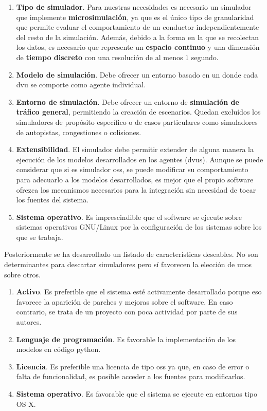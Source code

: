 \begin{enumerate}
	\item \textbf{Tipo de simulador}. Para nuestras necesidades es necesario un simulador que implemente \textbf{microsimulación}, ya que es el único tipo de granularidad que permite evaluar el comportamiento de un conductor independientemente del resto de la simulación. Además, debido a la forma en la que se recolectan los datos, es necesario que represente un \textbf{espacio continuo} y una dimensión de \textbf{tiempo discreto} con una resolución de al menos $1$ segundo.
	\item \textbf{Modelo de simulación}. Debe ofrecer un entorno basado en un \textbf{} donde cada \gls{dvu} se comporte como agente individual.
	\item \textbf{Entorno de simulación}. Debe ofrecer un entorno de \textbf{simulación de tráfico general}, permitiendo la creación de escenarios. Quedan excluídos los simuladores de propósito específico o de casos particulares como simuladores de autopistas, congestiones o colisiones.
	\item \textbf{Extensibilidad}. El simulador debe permitir extender de alguna manera la ejecución de los modelos desarrollados en los agentes (\glspl{dvu}). Aunque se puede considerar que si es simulador \gls{oss}, se puede modificar su comportamiento para adecuarlo a los modelos desarrollados, es mejor que el propio software ofrezca los mecanismos necesarios para la integración sin necesidad de tocar los fuentes del sistema.
	\item \textbf{Sistema operativo}. Es imprescindible que el software se ejecute sobre sistemas operativos GNU/Linux por la configuración de los sistemas sobre los que se trabaja.
\end{enumerate}

Posteriormente se ha desarrollado un listado de características deseables. No son determinantes para descartar simuladores pero sí favorecen la elección de unos sobre otros.

\begin{enumerate}
	\item \textbf{Activo}. Es preferible que el sistema esté activamente desarrollado porque eso favorece la aparición de parches y mejoras sobre el software. En caso contrario, se trata de un proyecto con poca actividad por parte de sus autores.
	\item \textbf{Lenguaje de programación}. Es favorable la implementación de los modelos en código \gls{python}.
	\item \textbf{Licencia}. Es preferible una licencia de tipo \Ac{oss} ya que, en caso de error o falta de funcionalidad, es posible acceder a los fuentes para modificarlos.
	\item \textbf{Sistema operativo}. Es favorable que el sistema se ejecute en entornos tipo OS X.
\end{enumerate}

